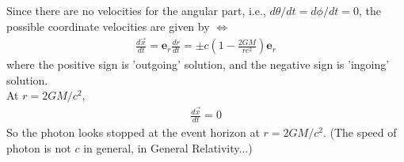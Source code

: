 \documentclass[12pt]{article}
\begin{document}
Since there are no velocities for the angular part, i.e., $d\theta/dt = d\phi/dt = 0$, the possible coordinate velocities are given by
$\Leftrightarrow$
\begin{align*}
\frac{d \Vec{x}}{d t} = \bm{e}_{r} \frac{d r}{d t} = \pm c \left(1 - \frac{2 G M}{r c^2}\right) \bm{e}_{r}
\end{align*}
where the positive sign is 'outgoing' solution, and the negative sign is 'ingoing' solution.\\
At $r = 2 G M / c^2$,
\begin{align*}
\frac{d \Vec{x}}{d t} = 0
\end{align*}
So the photon looks stopped at the event horizon at $r = 2 G M / c^2$. (The speed of photon is not $c$ in general, in General Relativity...)
\end{document}
